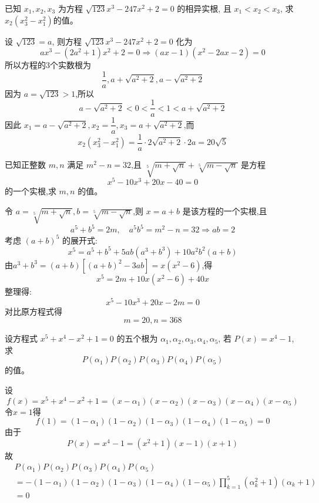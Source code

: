\begin{questions}
    \question 已知 $x_{1}, x_{2}, x_{3}$ 为方程 $\sqrt{123}x^{3}-247x^{2}+2=0$ 的相异实根, 且 $x_{1}<x_{2}<x_{3}$, 求 $x_{2}(x_{3}^{2}-x_{1}^{2})$的值。
    \begin{solution}
        设 $\sqrt{123}=a$, 则方程 $\sqrt{123}x^{3}-247x^{2}+2=0$ 化为 $$ax^{3}-(2a^{2}+1)x^{2}+2=0\Rightarrow(ax-1)(x^{2}-2ax-2)=0$$
        所以方程的3个实数根为 $$\frac{1}{a},a+\sqrt{a^{2}+2},a-\sqrt{a^{2}+2}$$
        因为 $a=\sqrt{123}>1$,所以 $$a-\sqrt{a^{2}+2}<0<\frac{1}{a}<1<a+\sqrt{a^{2}+2}$$
        因此 $x_{1}=a-\sqrt{a^{2}+2},x_{2}=\dfrac{1}{a}, x_{3}=a+\sqrt{a^{2}+2}$,而
        $$x_{2}(x_{3}^{2}-x_{1}^{2})=\frac{1}{a}\cdot2\sqrt{a^{2}+2}\cdot 2a=20\sqrt5$$
    \end{solution}
    
    \question 已知正整数 $m,n$ 满足 $m^2 - n = 32$,且 $\sqrt[5]{m+\sqrt{n}} + \sqrt[5]{m-\sqrt{n}}$ 是方程 $$x^5 - 10x^3 + 20x - 40 = 0$$ 的一个实根,求 $m,n$ 的值。
    
    \begin{solution}
        令 $a = \sqrt[5]{m+\sqrt{n}},b = \sqrt[5]{m-\sqrt{n}}$,则 $x = a + b$ 是该方程的一个实根,且
        \[
        a^5 + b^5 = 2m, \quad a^5 b^5 = m^2 - n = 32
        \Rightarrow ab = 2
        \]
        考虑 $(a + b)^5$ 的展开式:
        \[
        x^5 = a^5 + b^5 + 5ab(a^3 + b^3) + 10a^2 b^2 (a + b)
        \]
        由$a^3 + b^3 = (a + b)\left[(a + b)^2 - 3ab\right] = x(x^2 - 6)$,得 
        \[
        x^5 = 2m + 10x(x^2 - 6) + 40x 
        \]
        整理得:
        \[
        x^5 - 10x^3 + 20x- 2m=0
        \]
        对比原方程式得
        \[
        m = 20 , n = 368
        \]
    \end{solution}

    \question 设方程式 $x^5 + x^4 - x^2 + 1 = 0$ 的五个根为 $\alpha_1, \alpha_2, \alpha_3, \alpha_4, \alpha_5$, 若 $P(x) = x^4 - 1$,求 $$P(\alpha_1) P(\alpha_2) P(\alpha_3)  P(\alpha_4) P(\alpha_5)$$ 的值。
    \begin{solution}
        设
        \[
        f(x) = x^5 + x^4 - x^2 + 1 = (x - \alpha_1)(x - \alpha_2)(x - \alpha_3)(x - \alpha_4)(x - \alpha_5) 
        \]
        令$x=1$得
        \[
        f(1) = (1 - \alpha_1)(1 - \alpha_2)(1 - \alpha_3)(1 - \alpha_4)(1 - \alpha_5) = 0
        \]
        由于
        \[P(x) = x^4 - 1 = (x^2 + 1)(x - 1)(x + 1) \]
        故
        \begin{align*}
        &P(\alpha_1) P(\alpha_2) P(\alpha_3)  P(\alpha_4) P(\alpha_5)\\
        &= -(1 - \alpha_1)(1 - \alpha_2)(1 - \alpha_3)(1 - \alpha_4)(1 - \alpha_5) \prod_{k=1}^5 (\alpha_{k}^2+1)(\alpha_{k}+1)\\ &= 0
        \end{align*}
    \end{solution}


\end{questions}
